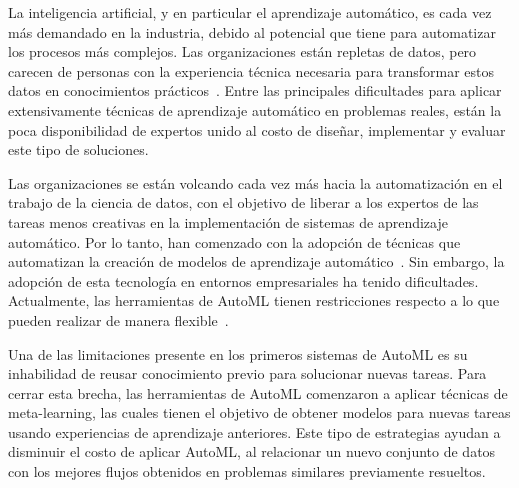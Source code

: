 \begin{conclusions}\label{conclusion}

\qquad 


La inteligencia artificial, y en particular el aprendizaje automático, es cada vez más demandado en la industria, debido al potencial que tiene para automatizar los procesos más complejos. Las organizaciones están repletas de datos, pero carecen de personas con la experiencia técnica necesaria para transformar estos datos en conocimientos prácticos~\cite{miller2017quant}. Entre las principales dificultades para aplicar extensivamente técnicas de aprendizaje automático en problemas reales, están la poca disponibilidad de expertos unido al costo de diseñar, implementar y evaluar este tipo de soluciones. 

Las organizaciones se están volcando cada vez más hacia la automatización en el trabajo de la ciencia de datos, con el objetivo de liberar a los expertos de las tareas menos creativas en la implementación de sistemas de aprendizaje automático. Por lo tanto, han comenzado con la adopción de técnicas que automatizan la creación de modelos de aprendizaje automático~\cite{drozdal2020trust, wang2019humanai}. Sin embargo, la adopción de esta tecnología en entornos empresariales ha tenido dificultades. Actualmente, las herramientas de AutoML tienen restricciones respecto a lo que pueden realizar de manera flexible~\cite{crisan2021fits}. %

Una de las limitaciones presente en los primeros sistemas de AutoML es su inhabilidad de reusar conocimiento previo para solucionar nuevas tareas. Para cerrar esta brecha, las herramientas de AutoML comenzaron a aplicar técnicas de meta-learning, las cuales tienen el objetivo de obtener modelos para nuevas tareas usando experiencias de aprendizaje anteriores. Este tipo de estrategias ayudan a disminuir el costo de aplicar AutoML, al relacionar un nuevo conjunto de datos con los mejores flujos obtenidos en problemas similares previamente resueltos. 


\end{conclusions}
